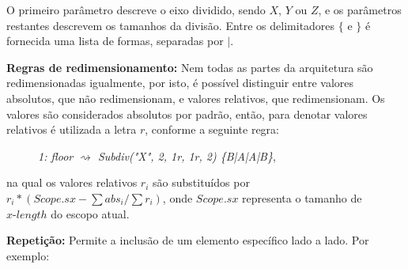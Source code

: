 \vspace{0.3cm}

O primeiro parâmetro descreve o eixo dividido, sendo $X$, $Y$ ou $Z$, e os parâmetros restantes descrevem os tamanhos da divisão. Entre os delimitadores $\{$ e $\}$ é fornecida uma lista de formas, separadas por $|$.

\begin{figure}[h!]
	\centering
	\captionsetup{width=15cm}
	{}	
\end{figure}

\textbf{Regras de redimensionamento:} Nem todas as partes da arquitetura são redimensionadas igualmente, por isto, é possível distinguir entre valores absolutos, que não redimensionam, e valores relativos, que redimensionam. Os valores são considerados absolutos por padrão, então, para denotar valores relativos é utilizada a letra $r$, conforme a seguinte regra:

\vspace{0.3cm}

\begin{description}
    \item[] \qquad \qquad \textit{1: floor $\rightsquigarrow$ Subdiv("X", 2, 1r, 1r, 2) \{B|A|A|B\}},
\end{description}

\vspace{0.3cm}

\noindent na qual os valores relativos $r_i$ são substituídos por $r_i * (Scope.sx - \sum abs_i / \sum r_i)$, onde $Scope.sx$ representa o tamanho de $x\mbox{-}length$ do escopo atual.

\textbf{Repetição:} Permite a inclusão de um elemento específico lado a lado. Por exemplo:

